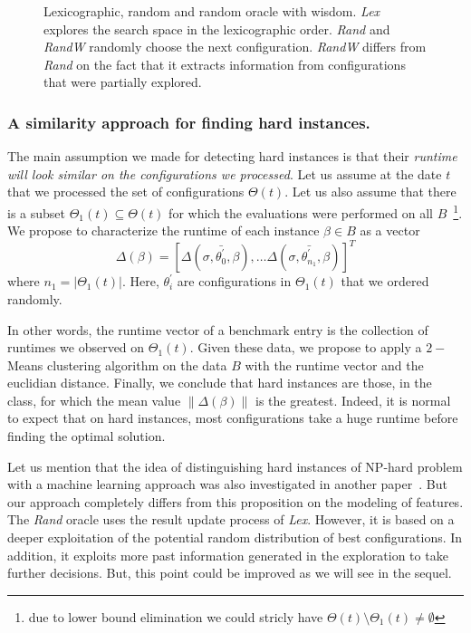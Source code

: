 \documentclass[10pt, conference, compsocconf]{IEEEtran}
\newcommand{\norm}[1]{\left\lVert#1\right\rVert}
\begin{document}
	\begin{figure}[hbtp]
	\begin{center}
	
	\caption{Lexicographic, random and random oracle with wisdom.
        {\it Lex} explores the search space in the lexicographic order. {\it Rand}  and {\it RandW} 
        randomly choose the next configuration. {\it RandW} differs from {\it Rand} on the fact that 
        it extracts information from configurations that were partially explored.}
	\label{fig:Search}
	\end{center}
	\end{figure}


\subsubsection{A similarity approach for finding hard instances.}  

The main assumption we made for detecting hard instances is that their {\it runtime will look similar on the configurations 
we processed}.
Let us assume at the date $t$ that we processed the set of configurations $\Theta(t)$. Let us also assume that 
there is a subset $\Theta_1(t) \subseteq \Theta(t)$ for which the evaluations were performed on all $B$~\footnote{due 
to lower bound elimination we could stricly have $\Theta(t) \setminus \Theta_1(t) \neq \emptyset$}. 
We propose to characterize the runtime of each instance $\beta \in B$ as a vector \[ \Delta(\beta) = [\Delta(\sigma, \bar{\theta^{'}_0}, \beta), \dots \Delta(\sigma, \bar{\theta^{'}_{n_1}}, \beta) ]^T \] where $n_1 = |\Theta_1(t)|$. Here, $\theta^{'}_{i}$ are configurations in $\Theta_1(t)$ 
that we ordered randomly.

In other words, the runtime vector of a benchmark entry is the collection of runtimes we observed on $\Theta_1(t)$. 
Given these data, we propose to apply a $2-$ Means clustering algorithm on the data $B$ with the runtime 
vector and the euclidian distance. Finally, we conclude that hard instances are those, in the class, for 
which the mean value $\norm{\Delta(\beta)}$ is the greatest. Indeed, it is normal to expect that on hard instances, 
most configurations take a huge runtime before finding the optimal solution. 

Let us mention that the idea of distinguishing hard instances of NP-hard problem with a machine learning approach was also 
investigated in another paper~\cite{WZZReport}. But our approach completely differs from this proposition on the modeling 
of features. 
The {\it Rand} oracle uses the result update process of {\it Lex}. However, it is based on a deeper exploitation 
of the potential random distribution of best configurations. In addition, it exploits more past information generated in 
the exploration to take further decisions. But, this point could be improved as we will see in the sequel.
\end{document}
